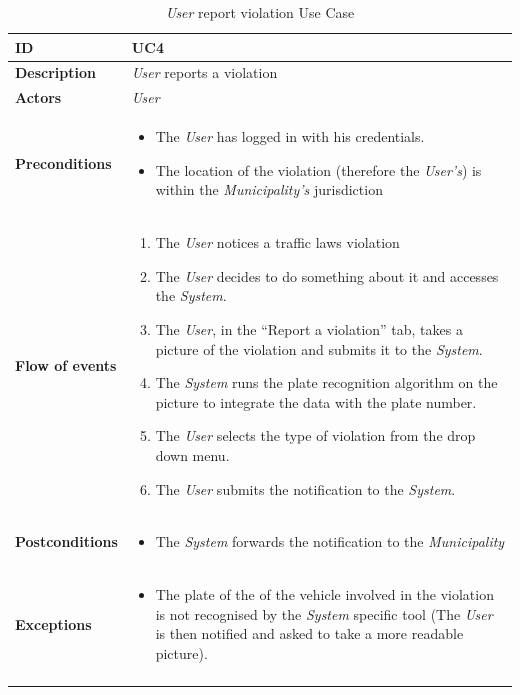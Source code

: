 \documentclass {article}
\begin{document}
	\begin{longtable}{| p{3 cm} | p{10.5 cm} |} 
			\hline
			{\bf ID} & UC4 \\
			\hline
			{\bf Description} & {\it User} reports a violation \\
			\hline
			{\bf Actors} & {\it User}\\
			\hline
			{\bf Preconditions} & \begin{itemize}
								  \item The {\it User} has logged in with his credentials.
								  \item The location of the violation (therefore the {\it User's}) is within the {\it Municipality's} jurisdiction
								  \end{itemize}	\\
			\hline
			{\bf Flow of events} &	\begin{enumerate}
								  \item The {\it User} notices a traffic laws violation 
								  \item The {\it User} decides to do something about it and accesses the {\it System}.
								  \item The {\it User}, in the “Report a violation” tab, takes a picture of the violation and submits it to the {\it System}.
								  \item The {\it System} runs the plate recognition algorithm on the picture to integrate the data with the plate number.
								  \item The {\it User} selects the type of violation from the drop down menu.
								  \item The {\it User} submits the notification to the {\it System}.
								  \end{enumerate}	\\
			\hline
			{\bf Postconditions} & \begin{itemize}
								  \item The {\it System} forwards the notification to the {\it Municipality}
								  \end{itemize}	 \\
			\hline
			{\bf Exceptions} & 	\begin{itemize}
								  \item The plate of the of the vehicle involved in the violation is not recognised by the {\it System} specific tool (The {\it User} is then notified and asked to take a more readable picture).
								  \end{itemize}	\\
			\hline
			\caption{{\it User} report violation Use Case}
			\end{longtable}
\end{document}
